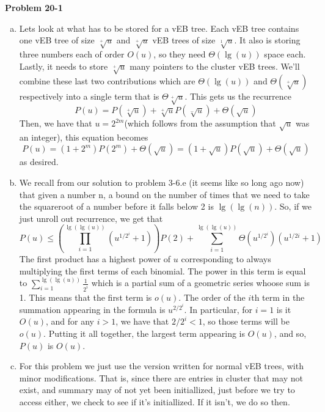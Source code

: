 \documentclass{article}
\begin{document}
\noindent\textbf{Problem 20-1}\\

\begin{enumerate}[a.]
\item
Lets look at what has to be stored for a vEB tree. Each vEB tree contains one vEB tree of size $\sqrt[+]{u}$ and $\sqrt[+]{u}$ vEB trees of size $\sqrt[1]{u}$. It also is storing three numbers each of order $O(u)$, so they need $\Theta(\lg(u))$ space each. Lastly, it needs to store $\sqrt[+]{u}$ many pointers to the cluster vEB trees. We'll combine these last two contributions which are $\Theta(\lg(u))$ and $\Theta(\sqrt[+]{u})$ respectively into a single term that is $\Theta\sqrt[+]{u}$. This gets us the recurrence
\[
P(u) = P(\sqrt[+]{u}) + \sqrt[+]{u}P(\sqrt[-]{u}) + \Theta(\sqrt{u})
\]
Then, we have that $u=2^{2m}$(which follows from the assumption that $\sqrt{u}$ was an integer), this equation becomes
\[
P(u) = (1+2^m)P(2^m) + \Theta(\sqrt{u}) = (1+ \sqrt{u})P(\sqrt{u})+\Theta(\sqrt{u})
\]
as desired.
\item
We recall from our solution to problem 3-6.e (it seems like so long ago now) that given a number n, a bound on the number of times that we need to take the squareroot of a number before it falls below 2 is $\lg(\lg(n))$. So, if we just unroll out recurrence, we get that
\[
P(u) \le \left(\prod_{i=1}^{\lg(\lg(u))}(u^{1/2^i}+1)\right) P(2) + \sum_{i=1}^{\lg(\lg(u))} \Theta(u^{1/2^i})(u^{1/2i}+1)
\]
The first product has a highest power of $u$ corresponding to always multiplying the first terms of each binomial. The power in this term is equal to $\sum_{i=1}^{\lg(\lg(u))} \frac{1}{2^i}$ which is a partial sum of a geometric series whoose sum is 1. This means that the first term is $o(u)$. The order of the $i$th term in the summation appearing in the formula is $u^{2/2^i}$. In particular, for $i=1$ is it $O(u)$, and for any $i>1$, we have that $2/2^i <1$, so those terms will be $o(u)$. Putting it all together, the largest term appearing is $O(u)$, and so, $P(u)$ is $O(u)$.
\item
For this problem we just use the version written for normal vEB trees, with minor modifications. That is, since there are entries in cluster that may not exist, and summary may of not yet been initiallized, just before we try to access either, we check to see if it's initiallized. If it isn't, we do so then.


\end{enumerate}
\end{document}

